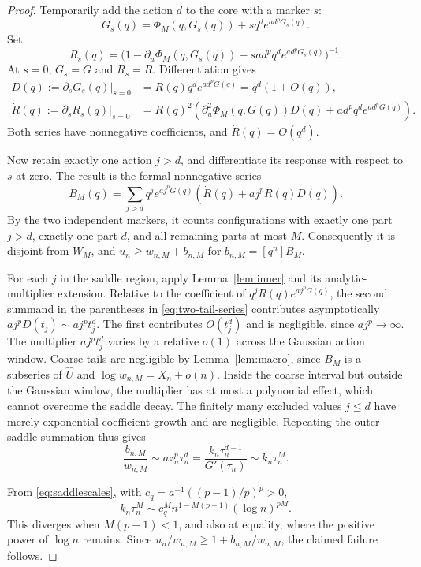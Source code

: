 \documentclass[11pt,a4paper]{article}
\numberwithin{equation}{section}
\theoremstyle{definition}
\theoremstyle{remark}
\newcommand{\Uhat}{\widehat U}\newcommand{\Vhat}{\widehat V}
\begin{document}
\begin{proof}
Temporarily add the action $d$ to the core with a marker $s$:
\begin{equation}
 G_s(q)=\Phi_M(q,G_s(q))+s q^d e^{a d^pG_s(q)}.
 \label{eq:marked-small}
\end{equation}
Set
\[
 R_s(q)=\bigl(1-\partial_u\Phi_M(q,G_s(q))
                 -s a d^p q^d e^{a d^pG_s(q)}\bigr)^{-1}.
\]
At $s=0$, $G_s=G$ and $R_s=R$. Differentiation gives
\begin{align}
 D(q):=\left.\partial_sG_s(q)\right|_{s=0}
 &=R(q)q^d e^{a d^pG(q)}=q^d(1+O(q)),\\
 \dot R(q):=\left.\partial_sR_s(q)\right|_{s=0}
 &=R(q)^2\left(\partial_u^2\Phi_M(q,G(q))D(q)
                       +a d^p q^d e^{a d^pG(q)}\right).
 \label{eq:marked-derivatives}
\end{align}
Both series have nonnegative coefficients, and $\dot R(q)=O(q^d)$.

Now retain exactly one action $j>d$, and differentiate its response
with respect to $s$ at zero. The result is the formal nonnegative series
\begin{equation}
 B_M(q)=\sum_{j>d}q^j e^{a j^pG(q)}
             \left(\dot R(q)+a j^pR(q)D(q)\right).
 \label{eq:two-tail-series}
\end{equation}
By the two independent markers, it counts configurations with exactly one
part $j>d$, exactly one part $d$, and all remaining parts at most $M$.
Consequently it is disjoint from $W_M$, and
$u_n\ge w_{n,M}+b_{n,M}$ for $b_{n,M}=[q^n]B_M$.

For each $j$ in the saddle region, apply Lemma~\ref{lem:inner} and its
analytic-multiplier extension. Relative to the coefficient of
$q^j R(q)e^{a j^pG(q)}$, the second summand in the parentheses in
\eqref{eq:two-tail-series} contributes asymptotically
$a j^p D(t_j)\sim a j^p t_j^d$. The first contributes $O(t_j^d)$ and
is negligible, since $a j^p\to\infty$.
The multiplier $a j^p t_j^d$ varies by a relative $o(1)$ across the
Gaussian action window. Coarse tails are negligible by Lemma~\ref{lem:macro},
since $B_M$ is a subseries of $\Uhat$ and $\log w_{n,M}=X_n+o(n)$.
Inside the coarse interval but outside the Gaussian window, the multiplier
has at most a polynomial effect,
which cannot overcome the saddle decay. The finitely many excluded values
$j\le d$ have merely exponential coefficient growth and are negligible.
Repeating the outer-saddle summation thus gives
\[
 \frac{b_{n,M}}{w_{n,M}}
 \sim a z_n^p\tau_n^d
 =\frac{k_n\tau_n^{d-1}}{G'(\tau_n)}
 \sim k_n\tau_n^M.
\]

From \eqref{eq:saddlescales}, with
$c_q=a^{-1}((p-1)/p)^p>0$,
\begin{equation}
 k_n\tau_n^M
 \sim c_q^M n^{1-M(p-1)}(\log n)^{pM}.
 \label{eq:cutoff-scale}
\end{equation}
This diverges when $M(p-1)<1$, and also at equality, where the positive
power of $\log n$ remains. Since
$u_n/w_{n,M}\ge1+b_{n,M}/w_{n,M}$, the claimed failure follows.
\end{proof}
\end{document}
